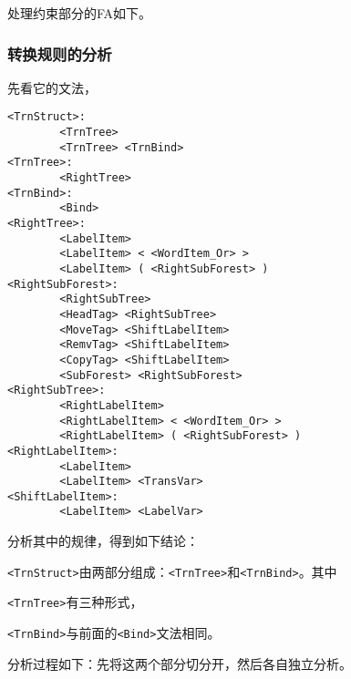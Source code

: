 \documentclass{article}
\begin{document}
\begin{CJK}{UTF8}{gbsn}
处理约束部分的FA如下。

\vspace{1pc}
\begin{center}
\end{center}

\subsubsection{转换规则的分析}

先看它的文法，

\vspace{1pc}
\begin{verbatim}
<TrnStruct>:
        <TrnTree>
        <TrnTree> <TrnBind>
<TrnTree>:
        <RightTree>
<TrnBind>:
        <Bind>
<RightTree>:
        <LabelItem>
        <LabelItem> < <WordItem_Or> >
        <LabelItem> ( <RightSubForest> )
<RightSubForest>:
        <RightSubTree>
        <HeadTag> <RightSubTree>
        <MoveTag> <ShiftLabelItem>
        <RemvTag> <ShiftLabelItem>
        <CopyTag> <ShiftLabelItem>
        <SubForest> <RightSubForest>
<RightSubTree>:
        <RightLabelItem>
        <RightLabelItem> < <WordItem_Or> >
        <RightLabelItem> ( <RightSubForest> )
<RightLabelItem>:
        <LabelItem>
        <LabelItem> <TransVar>
<ShiftLabelItem>:
        <LabelItem> <LabelVar>
\end{verbatim}

\vspace{1pc}
分析其中的规律，得到如下结论：
\begin{itemize*}
\item \verb|<TrnStruct>|由两部分组成：\verb|<TrnTree>|和\verb|<TrnBind>|。其中
\item \verb|<TrnTree>|有三种形式，
\item \verb|<TrnBind>|与前面的\verb|<Bind>|文法相同。
\end{itemize*}
分析过程如下：先将这两个部分切分开，然后各自独立分析。


\end{CJK}
\end{document}
